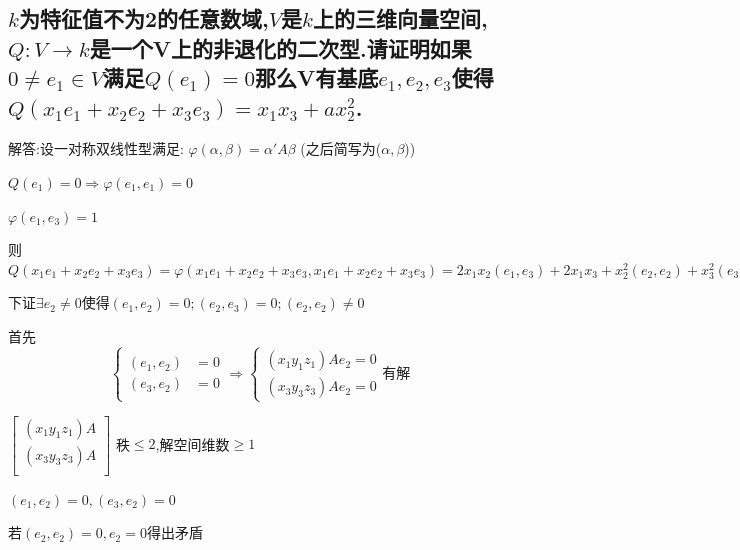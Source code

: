 \documentclass[UTF8]{book}
\begin{document}
		\subsection{$ k $为特征值不为2的任意数域,$ V $是$ k $上的三维向量空间,$ Q:V \to k $是一个V上的非退化的二次型.请证明如果$ 0 \ne e_{1} \in V $满足$ Q(e_{1} )=0 $那么V有基底$e_{1},e_{2},e_{3}$使得$ Q(x_{1} e_{1} + x_{2} e_{2} + x_{3} e_{3} )= x_{1} x_{3} +a x_{2}^{2}$.}
			解答:设一对称双线性型满足:
				$\varphi(\alpha,\beta)=\alpha 'A \beta$ (之后简写为($\alpha,\beta$))
				
				
				$ Q(e_{1} )=0 \Rightarrow \varphi (e_{1},e_{1} )=0 $
				
				
				$\varphi(e_{1},e_{3})=1$
				
				
				则$Q(x_{1} e_{1}+x_{2} e_{2}+x_{3} e_{3} )= \varphi (x_{1} e_{1}+x_{2} e_{2}+x_{3} e_{3},x_{1} e_{1}+x_{2} e_{2}+x_{3} e_{3} )
				=2 x_{1} x_{2}(e_{1},e_{3} )+2 x_{1} x_{3}+x_{2}^{2}(e_{2},e_{2} )+ x_{3}^{2}(e_{3},e_{3})+2 x_{2} x_{3}(e_{2},e_{3})$
				
				
				下证$\exists e_{2} \ne 0$使得$(e_{1},e_{2} )=0;(e_{2},e_{3} )=0;(e_{2},e_{2})\ne 0$
				
				
				首先
				\begin{equation*}
				\left\{\begin{aligned}\left(e_{1}, e_{2}\right) &=0 \\\left(e_{3}, e_{2}\right) &=0 \end{aligned} \Rightarrow\left\{\begin{array}{l}{\left(x_{1} y_{1} z_{1}\right) A e_{2}=0} \\ {\left(x_{3} y_{3} z_{3}\right) A e_{2}=0}\end{array}\right.\right. \text{有解}
				\end{equation*}
				
				$\begin{bmatrix}
				    (x_{1}y_{1}z_{1})A\\
				    (x_{3}y_{3}z_{3})A\\
				\end{bmatrix}$
				秩$\le 2$,解空间维数$\ge 1$
				
				
				$(e_{1},e_{2})=0,(e_{3},e_{2})=0$
				
				
				若$(e_{2},e_{2})=0,e_{2}=0$得出矛盾
				
\end{document}
